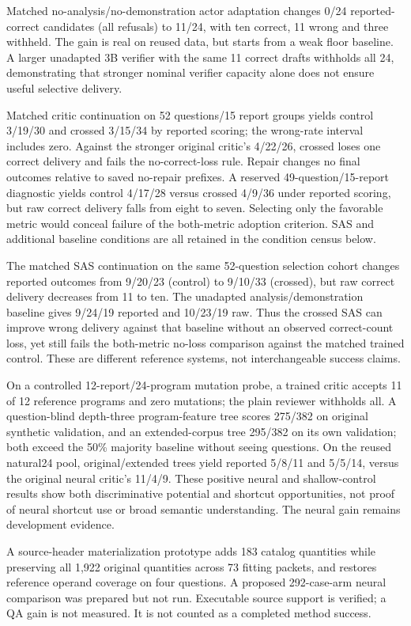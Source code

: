 \documentclass[letterpaper]{article}
\begin{document}
Matched no-analysis/no-demonstration actor adaptation changes 0/24 reported-correct candidates (all refusals) to 11/24, with ten correct, 11 wrong and three withheld. The gain is real on reused data, but starts from a weak floor baseline. A larger unadapted 3B verifier with the same 11 correct drafts withholds all 24, demonstrating that stronger nominal verifier capacity alone does not ensure useful selective delivery.

Matched critic continuation on 52 questions/15 report groups yields control 3/19/30 and crossed 3/15/34 by reported scoring; the wrong-rate interval includes zero. Against the stronger original critic's 4/22/26, crossed loses one correct delivery and fails the no-correct-loss rule. Repair changes no final outcomes relative to saved no-repair prefixes. A reserved 49-question/15-report diagnostic yields control 4/17/28 versus crossed 4/9/36 under reported scoring, but raw correct delivery falls from eight to seven. Selecting only the favorable metric would conceal failure of the both-metric adoption criterion. SAS and additional baseline conditions are all retained in the condition census below.

The matched SAS continuation on the same 52-question selection cohort changes reported outcomes from 9/20/23 (control) to 9/10/33 (crossed), but raw correct delivery decreases from 11 to ten. The unadapted analysis/demonstration baseline gives 9/24/19 reported and 10/23/19 raw. Thus the crossed SAS can improve wrong delivery against that baseline without an observed correct-count loss, yet still fails the both-metric no-loss comparison against the matched trained control. These are different reference systems, not interchangeable success claims.

On a controlled 12-report/24-program mutation probe, a trained critic accepts 11 of 12 reference programs and zero mutations; the plain reviewer withholds all. A question-blind depth-three program-feature tree scores 275/382 on original synthetic validation, and an extended-corpus tree 295/382 on its own validation; both exceed the 50\% majority baseline without seeing questions. On the reused natural24 pool, original/extended trees yield reported 5/8/11 and 5/5/14, versus the original neural critic's 11/4/9. These positive neural and shallow-control results show both discriminative potential and shortcut opportunities, not proof of neural shortcut use or broad semantic understanding. The neural gain remains development evidence.

A source-header materialization prototype adds 183 catalog quantities while preserving all 1,922 original quantities across 73 fitting packets, and restores reference operand coverage on four questions. A proposed 292-case-arm neural comparison was prepared but not run. Executable source support is verified; a QA gain is not measured. It is not counted as a completed method success.
\end{document}

